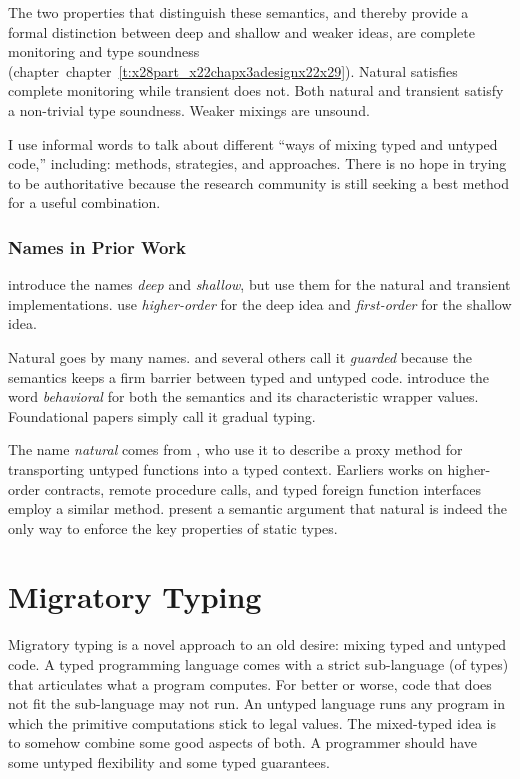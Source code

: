 \documentclass[ twoside,open=right,titlepage,numbers=noenddot,headinclude,%
                footinclude=true,cleardoublepage=empty,abstract=off,
                BCOR=5mm,paper=a4,fontsize=11pt,%
                ngerman,american,%
                parts,pdfspacing]{scrreprt}
\newcommand{\sectionNewpage}{}
\newcommand{\ChapRef}[2]{\SecRef{#1}{#2}}
\newcommand{\SecRef}[2]{section~#1}
\newcommand{\ChapRefLocal}[3]{\hyperref[#1]{\ChapRef{#2}{#3}}}
\let\SOriginalthesubsection\thesubsection
\newcommand{\Ssection}[2]{\section[#1]{#2}\let\thesubsection\SOriginalthesubsection}
\newcommand{\Ssubsubsection}[2]{\subsubsection[#1]{#2}}
\renewcommand{\Ssection}[2]{\chapter[#1]{#2}}
\renewcommand{\Ssubsubsection}[2]{\subsection[#1]{#2}}
\renewcommand{\ChapRefLocal}[3]{chapter~\ref{#1}}
\begin{document}
The two properties that distinguish these semantics, and thereby provide a
 formal distinction between deep and shallow and weaker ideas,
 are complete monitoring and type soundness (chapter~\ChapRefLocal{t:x28part_x22chapx3adesignx22x29}{4}{Design Analysis Method}).
Natural satisfies complete monitoring while transient does not.
Both natural and transient satisfy a non{-}trivial type soundness.
Weaker mixings are unsound.

I use informal words to talk about
 different {``}ways of mixing typed and untyped code,{''} including:
 methods, strategies, and approaches.
There is no hope in trying to be authoritative because the research community
 is still seeking a best method for a useful combination.

\Ssubsubsection{Names in Prior Work}{Names in Prior Work}\label{t:x28part_x22Namesx5finx5fPriorx5fWorkx22x29}

 introduce the names \emph{deep} and \emph{shallow}, but use
 them for the natural and transient implementations.
 use \emph{higher{-}order} for the deep idea and
 \emph{first{-}order} for the shallow idea.

Natural goes by many names.
 and several others call it \emph{guarded} because
 the semantics keeps a firm barrier between typed and untyped code.
 introduce the word \emph{behavioral} for both
 the semantics and its characteristic wrapper values.
Foundational papers simply call it gradual typing.

The name \emph{natural} comes from , who use it
 to describe a proxy method for transporting untyped functions into a
 typed context.
Earliers works on higher{-}order contracts,
 remote procedure calls, and
 typed foreign function interfaces
 employ a similar method.
 present a semantic argument that natural is indeed
 the only way to enforce the key properties of static types.

\sectionNewpage

\Ssection{Migratory Typing}{Migratory Typing}\label{t:x28part_x22chapx3awhyx22x29}

Migratory typing is a novel approach to an old desire:
 mixing typed and untyped code.
A typed programming language comes with a strict sub{-}language (of types)
 that articulates what a program computes.
For better or worse, code that does not fit the sub{-}language may not run.
An untyped language runs any program in which the primitive computations
 stick to legal values.
The mixed{-}typed idea is to somehow combine some good aspects of both.
A programmer should have some untyped flexibility and some typed guarantees.
\end{document}
